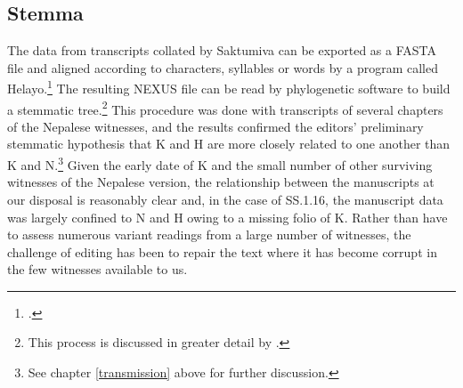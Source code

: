 %    
%    
%    

\subsection{Stemma} The data from transcripts collated by Saktumiva can be
exported as a FASTA file and aligned according to characters, syllables or
words by a program called Helayo.\footcite{li-2022} The resulting NEXUS file
can be read by phylogenetic software to build a stemmatic tree.\footnote{This
    process is discussed in greater detail by \citet{li-2022b}.} This procedure was done 
    with transcripts of several
    chapters of the Nepalese witnesses, and the results confirmed the editors'
    preliminary stemmatic hypothesis that K and H are more closely related to one
    another than K and N.\footnote{See chapter \ref{transmission} above
         for further discussion.} Given the early date of K and
        the small number of other surviving witnesses of the Nepalese version, the
        relationship between the manuscripts at our disposal is reasonably clear and,
        in the case of SS.1.16, the manuscript data was largely confined to N and H
        owing to a missing folio of K. Rather than have to assess numerous variant
        readings from a large number of witnesses, the challenge of editing has been
        to repair the text where it has become corrupt in the few witnesses available
        to us.

